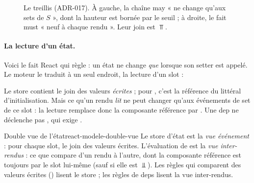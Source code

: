 \ifhastikz
\begin{figure}[htbp]\centering
{}
\caption{Le treillis  (ADR-017). À gauche, la chaîne may
« ne change qu'aux sets de $S$ », dont la hauteur est bornée par le seuil
 ; à droite, le fait must « neuf à chaque
rendu ». Leur join est $\Top$.}
\label{fig:react-modele-stability}
\end{figure}
\fi

\paragraph{La lecture d'un état.} Voici le fait React qui règle
 : un état ne change \emph{que} lorsque son setter est
appelé. Le moteur le traduit à un seul endroit, la lecture d'un slot :


Le store contient le join des valeurs \emph{écrites} ; pour ,
c'est la référence  du littéral d'initialisation. Mais ce qu'un
rendu \emph{lit} ne peut changer qu'aux événements de set de ce slot : la
lecture remplace donc la composante référence par
. Une dep  ne déclenche
pas , qui exige .

\begin{invariant}{Double vue de l'état}{react-modele-double-vue}
Le store d'état est la \emph{vue événement} : pour chaque slot, le join des
valeurs écrites. L'évaluation de  est la \emph{vue
inter-rendus} : ce que  compare d'un rendu à l'autre, dont la
composante référence est toujours  par le slot lui-même (sauf
si elle est $\Bot$). Les règles qui comparent des valeurs écrites
() lisent le store ; les règles de deps lisent la
vue inter-rendus.
\end{invariant}

